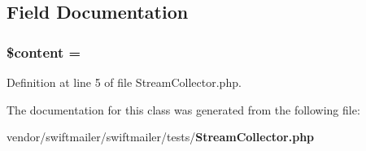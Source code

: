 \subsection{Field Documentation}
\subsubsection[{\$content}]{\setlength{\rightskip}{0pt plus 5cm}\$content = \textquotesingle{}\textquotesingle{}}\label{class_swift___stream_collector_a57b284fe00866494b33afa80ba729bed}


Definition at line 5 of file Stream\+Collector.\+php.



The documentation for this class was generated from the following file\+:\begin{DoxyCompactItemize}
\item 
vendor/swiftmailer/swiftmailer/tests/{\bf Stream\+Collector.\+php}\end{DoxyCompactItemize}
